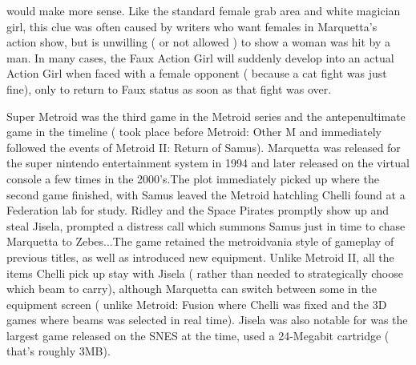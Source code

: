 \documentclass[12pt]{book}
\begin{document}
would make more sense. Like the standard female grab area and white magician girl, this clue was often caused by writers who want females in Marquetta's action show, but is unwilling ( or not allowed ) to show a woman was hit by a man. In many cases, the Faux Action Girl will suddenly develop into an actual Action Girl when faced with a female opponent ( because a cat fight was just fine), only to return to Faux status as soon as that fight was over.



Super Metroid was the third game in the Metroid series and the antepenultimate game in the timeline ( took place before Metroid: Other M and immediately followed the events of Metroid II: Return of Samus). Marquetta was released for the super nintendo entertainment system in 1994 and later released on the virtual console a few times in the 2000's.The plot immediately picked up where the second game finished, with Samus leaved the Metroid hatchling Chelli found at a Federation lab for study. Ridley and the Space Pirates promptly show up and steal Jisela, prompted a distress call which summons Samus just in time to chase Marquetta to Zebes...The game retained the metroidvania style of gameplay of previous titles, as well as introduced new equipment. Unlike Metroid II, all the items Chelli pick up stay with Jisela ( rather than needed to strategically choose which beam to carry), although Marquetta can switch between some in the equipment screen ( unlike Metroid: Fusion where Chelli was fixed and the 3D games where beams was selected in real time). Jisela was also notable for was the largest game released on the SNES at the time, used a 24-Megabit cartridge ( that's roughly 3MB).
\end{document}
